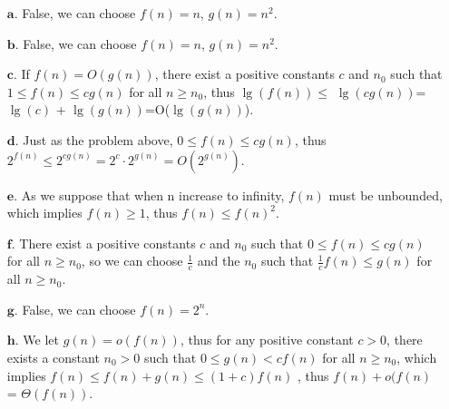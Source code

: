 \documentclass[a4paper, justified]{tufte-handout}
\begin{document}
\begin{solution}
\begin{enumerate}
    \item [$\bm{a.}$]False, we can choose  $f(n) = n$, $g(n) = n^{2}$.
    \item [$\bm{b.}$]False, we can choose $f(n) = n$, $g(n) = n^{2}$.
    \item [$\bm{c.}$]If $f(n) = O(g(n))$, there exist a positive constants $c$ and $n_0$ such that $1 \le f(n) \le cg(n)$ for all $n \ge n_0$, thus $\lg(f(n)) \le$ $\lg(cg(n))$= $\lg(c)$ + $\lg(g(n))$=O($\lg(g(n))$).
    \item [$\bm{d.}$]Just as the problem above, $0 \le f(n) \le cg(n)$, thus $2^{f(n)} \le 2^{cg(n)} = 2^{c} \cdot 2^{g(n)} = O(2^{g(n)})$.
    \item [$\bm{e.}$] As we suppose that when n increase to infinity, $f(n)$ must be unbounded, which implies $f(n) \ge 1$, thus $f(n) \le f(n)^{2}$.
    \item [$\bm{f.}$] There exist a positive constants $c$ and $n_0$ such that $0 \le f(n) \le cg(n)$ for all $n \ge n_0$, so we can choose $\frac{1}{c}$ and the $n_0$ such that $\frac{1}{c}f(n) \le g(n)$ for all $n \ge n_0$.
    \item [$\bm{g.}$] False, we can choose $f(n) = 2^{n}$.
    \item[$\bm{h.}$]We let $g(n) = o(f(n))$, thus for any positive constant $c > 0$, there exists a constant $n_0 > 0$ such that $0 \le g(n) < cf(n) $ for all $n \ge n_0$, which implies $f(n) \le f(n) + g(n) \le (1+c)f(n) $ , thus $f(n) + o(f(n)$ = $\Theta(f(n))$.
\end{enumerate} 
\end{solution}


\end{document}
